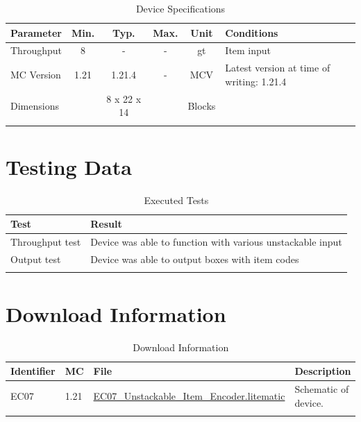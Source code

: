 \documentclass[10pt]{datasheet}
\begin{document}
\begin{table}[H]
    \caption{Device Specifications}
    \begin{tabularx}{\textwidth}{l | c c c | c | X}
        \thickhline
        \textbf{Parameter} & \textbf{Min.} & \textbf{Typ.} & \textbf{Max.} &
        \textbf{Unit} & \textbf{Conditions} \\
        \hline
        Throughput  & 8 & - & - & gt & Item input \\
        \hline
        MC Version & 1.21 & 1.21.4 & - & MCV & Latest version at time of writing: 1.21.4\\
        \hline
        Dimensions & & 8 x 22 x 14 & & Blocks & \\
        \thickhline
\end{tabularx}
\end{table}
\section{Testing Data}
\begin{table}[H]
\caption{Executed Tests}
\begin{tabularx}{\textwidth}{l | X}
    \thickhline
    \textbf{Test} & \textbf{Result} \\
    \hline
    Throughput test & Device was able to function with various unstackable input \\
    \hline
    Output test & Device was able to output boxes with item codes \\
    \thickhline
\end{tabularx}
\end{table}

\section{Download Information}
\begin{table}[H]
    \caption{Download Information}
    \begin{tabularx}{\textwidth}{l | l | l | X}
        \thickhline
        \textbf{Identifier} & \textbf{MC} & \textbf{File} & \textbf{Description} \\
        \hline
        EC07 & 1.21 & \href{https://github.com/Soontech-Annals/Archive/blob/b56572c0d2b4f182d9e9d41449d8cb2963b923ae/Archive/encoders/EC07\%20Unstackable\%20Item\%20Encoder/EC07\_Unstackable\_Item\_Encoder.litematic?raw=1}{EC07\_Unstackable\_Item\_Encoder.litematic} & Schematic of device. \\
        \hline
        \thickhline
    \end{tabularx}
\end{table}
\end{document}
